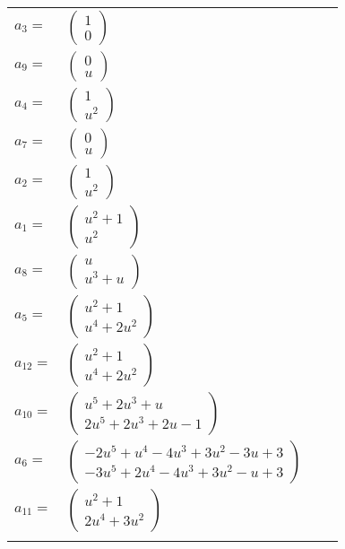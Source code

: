 \documentclass[1p]{elsarticle_modified}
\theoremstyle{definition}
\begin{document}
\begin{tabular}{m{7pt} m{180pt} m{7pt} m{180pt} }
\flushright $a_{3}=$&$\begin{pmatrix}1\\0\end{pmatrix}$ \\
\flushright $a_{9}=$&$\begin{pmatrix}0\\u\end{pmatrix}$ \\
\flushright $a_{4}=$&$\begin{pmatrix}1\\u^2\end{pmatrix}$ \\
\flushright $a_{7}=$&$\begin{pmatrix}0\\u\end{pmatrix}$ \\
\flushright $a_{2}=$&$\begin{pmatrix}1\\u^2\end{pmatrix}$ \\
\flushright $a_{1}=$&$\begin{pmatrix}u^2+1\\u^2\end{pmatrix}$ \\
\flushright $a_{8}=$&$\begin{pmatrix}u\\u^3+u\end{pmatrix}$ \\
\flushright $a_{5}=$&$\begin{pmatrix}u^2+1\\u^4+2 u^2\end{pmatrix}$ \\
\flushright $a_{12}=$&$\begin{pmatrix}u^2+1\\u^4+2 u^2\end{pmatrix}$ \\
\flushright $a_{10}=$&$\begin{pmatrix}u^5+2 u^3+u\\2 u^5+2 u^3+2 u-1\end{pmatrix}$ \\
\flushright $a_{6}=$&$\begin{pmatrix}-2 u^5+u^4-4 u^3+3 u^2-3 u+3\\-3 u^5+2 u^4-4 u^3+3 u^2- u+3\end{pmatrix}$ \\
\flushright $a_{11}=$&$\begin{pmatrix}u^2+1\\2 u^4+3 u^2\end{pmatrix}$\\&\end{tabular}
\end{document}
